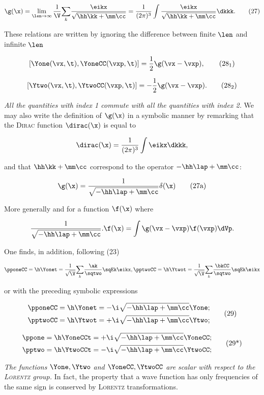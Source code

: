 \documentclass{article}
\newcommand{\inv}[1]{\frac{1}{#1}}
\newcommand{\commutator}[2]{\left[ #1, #2 \right]}
\newcommand{\sqV}{\sqrt{\V}}
\newcommand{\isqV}{\inv{\sqV}}
\renewcommand{\it}[1]{\textit{#1}}
\renewcommand{\sc}[1]{\textsc{#1}}
\newcommand{\sumk}{\underset{k}{\sum}}
\newcommand{\limit}[1]{\lim_{#1}}
\newcommand{\nequ}[2]{
\begin{equation*}
#1
\tag{#2}
\end{equation*}
}
\newcommand{\uequ}[1]{
\begin{equation*}
#1
\end{equation*}
}
\begin{document}
\nequ{
\g(\x) = \limit{\len \rightarrow \infty}\inv{\V}\sumk\frac{\eikx}{\sqrt{\hh\kk + \mm\cc}}
 = \inv{(2\pi)^3}\int\frac{\eikx}{\sqrt{\hh\kk + \mm\cc}}\dkkk.
}{27}

These relations are written by ignoring the difference between finite $\len$ and infinite $\len$

\nequ{
\commutator{\Yone(\vx, \t)}{\YoneCC(\vxp, \t)} = \inv{2}\g(\vx - \vxp),
}{$28_1$}

\nequ{
\commutator{\Ytwo(\vx, \t)}{\YtwoCC(\vxp, \t)} = -\inv{2}\g(\vx - \vxp).
}{$28_2$}

\it{All the quantities with index 1 commute with all the quantities with index 2.} We may also write the definition of $\g(\x)$ in a symbolic manner by remarking that the \sc{Dirac} function $\dirac(\x)$ is equal to

\uequ{
\dirac(\x) = \inv{(2\pi)^3}\int \eikx\dkkk,
}

and that $\hh\kk + \mm\cc$ correspond to the operator $-\hh\lap + \mm\cc$:

\nequ{
\g(\x) = \inv{\sqrt{-\hh\lap + \mm\cc}}\delta(\x)
}{27a}

More generally and for a function $\f(\x)$ where

\uequ{
\inv{\sqrt{-\hh\lap + \mm\cc}}. \f(\x) = \int\g(\vx - \vxp)\f(\vxp)\dVp.
}

One finds, in addition, following (23)

\uequ{
\pponeCC = \h\Yonet = \isqV\sumk\frac{\ak}{\sqtwo}\sqEk\eikx,
\pptwoCC = \h\Ytwot = \isqV\sumk\frac{\bkCC}{\sqtwo}\sqEk\eikx
}

or with the preceding symbolic expressions

\nequ{
\begin{split}
\pponeCC = \h\Yonet &= -\i\sqrt{-\hh\lap + \mm\cc}\Yone;\\
\pptwoCC = \h\Ytwot &= +\i\sqrt{-\hh\lap + \mm\cc}\Ytwo;
\end{split}
}{29}

\nequ{
\begin{split}
\ppone = \h\YoneCCt &= +\i\sqrt{-\hh\lap + \mm\cc}\YoneCC;\\
\pptwo = \h\YtwoCCt &= -\i\sqrt{-\hh\lap + \mm\cc}\YtwoCC;
\end{split}
}{29*}

\it{The functions $\Yone, \Ytwo$ and $\YoneCC, \YtwoCC$ are scalar with respect to the \sc{Lorentz} group.} In fact, the property that a wave function has only frequencies of the same sign is conserved by \sc{Lorentz} transformations.
\end{document}
